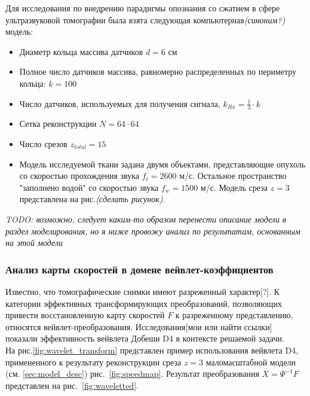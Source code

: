 \documentclass[14pt]{matmex-diploma}
\begin{document}
Для исследования по внедрению парадигмы опознания со сжатием в сфере ультразвуковой томографии была взята следующая компьютерная\textit{(синоним?)} модель:
\begin{itemize}
\item Диаметр кольца массива датчиков $d = 6 \text{ см}$
\item Полное число датчиков массива, равномерно распределенных по периметру кольца: $k = 100$
\item Число датчиков, используемых для получения сигнала, $k_{Rx} = \frac{1}{3} \cdot k$
\item Сетка реконструкции $N = 64\cdot 64$
\item Число срезов $z_{total} = 15$
\item Модель исследуемой ткани задана двумя объектами, представляющие опухоль со скоростью прохождения звука $f_t = 2600$ м/с. Остальное пространство "заполнено водой" со скоростью звука $f_w = 1500$ м/с. Модель среза $z = 3$ представлена на рис.\textit{(сделать рисунок)}. 

\end{itemize}
\textit{TODO: возможно, следует каким-то образом перенести описание модели в раздел моделирования, но я ниже провожу анализ по результатам, основанным на этой модели}


\subsubsection{Анализ карты скоростей в домене вейвлет-коэффициентов} \label{sec:s_analysis}
Известно, что томографические снимки имеют разреженный характер[?]. К категории эффективных трансформирующих преобразований, позволяющих привести восстановленную карту скоростей $F$ к разреженному представлению, относятся вейвлет-преобразования. Исследования[мои или найти ссылки] показали эффективность вейвлета Добеши D4 в контексте решаемой задачи. \\
На рис.\ref{fig:wavelet_transform} представлен пример использования вейвлета D4, примененного к результату реконструкции среза $z=3$ маломасштабной модели (см. \ref{sec:model_desc}) рис.~\ref{fig:speedmap}. Результат преобразования $X = \Psi^{-1} F$ представлен на рис.~\ref{fig:waveletted}.\\
\end{document}
